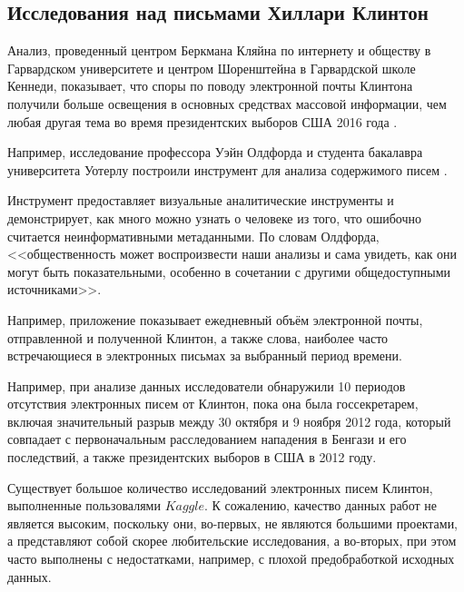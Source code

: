\subsection{Исследования над письмами Хиллари Клинтон}


Анализ, проведенный центром Беркмана Кляйна по интернету и обществу в Гарвардском университете и центром Шоренштейна в Гарвардской школе Кеннеди, показывает, что споры по поводу электронной почты Клинтона получили больше освещения в основных средствах массовой информации, чем любая другая тема во время президентских выборов США 2016 года \cite{clinton_research_bib}.

Например, исследование профессора Уэйн Олдфорда и студента бакалавра университета Уотерлу построили инструмент для анализа содержимого писем \cite{clinton_oldford_bib}.

Инструмент предоставляет визуальные аналитические инструменты и демонстрирует, как много можно узнать о человеке из того, что ошибочно считается неинформативными метаданными. По словам Олдфорда, <<общественность может воспроизвести наши анализы и сама увидеть, как они могут быть показательными, особенно в сочетании с другими общедоступными источниками>>.

Например, приложение показывает ежедневный объём электронной почты, отправленной и полученной Клинтон, а также слова, наиболее часто встречающиеся в электронных письмах за выбранный период времени.

Например, при анализе данных исследователи обнаружили 10 периодов отсутствия электронных писем от Клинтон, пока она была госсекретарем, включая значительный разрыв между 30 октября и 9 ноября 2012 года, который совпадает с первоначальным расследованием нападения в Бенгази и его последствий, а также президентских выборов в США в 2012 году.

Существует большое количество исследований электронных писем Клинтон, выполненные пользовалями $Kaggle$. К сожалению, качество данных работ не является высоким, поскольку они, во-первых, не являются большими проектами, а представляют собой скорее любительские исследования, а во-вторых, при этом часто выполнены с недостатками, например, с плохой предобработкой исходных данных. 
